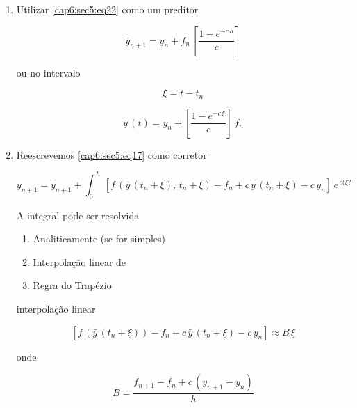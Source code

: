 \begin{enumerate}

\item Utilizar \ref{cap6:sec5:eq22} como um preditor

\begin{equation}
 \label{cap6:sec5:eq23}
 \bar{y}_{n+1} = y_n + f_n \, \left[ \frac{1 - e^{-c\,h}}{c} \right]
\end{equation}

ou no intervalo 

\[
 \xi = t - t_n
\]

\begin{equation}
 \label{cap6:sec5:eq24}
 \bar{y} \, (t) = y_n + \left[ \frac{1 - e^{-c\,\xi}}{c} \right] \, f_n
\end{equation}

\item Reescrevemos \ref{cap6:sec5:eq17} como corretor

\begin{equation}
 \label{cap6:sec5:eq25}
 y_{n+1} = \bar{y}_{n+1} + \int^{\,h}_0 \, [f \, (\bar{y} \, (t_n + \xi), \, t_n + \xi) - f_n + c \, \bar{y} \, (t_n + \xi) - c \, y_n] \, e^{\,c(\xi?}
\end{equation}

A integral pode ser resolvida

\begin{enumerate}

\item Analiticamente (se  for simples)

\item Interpolação linear de \esp{[ \, ]}

\item Regra do Trapézio

\end{enumerate}

interpolação linear

\begin{equation}
 \label{cap6:sec5:eq26}
 [f \, (\bar{y} \, (t_n + \xi)) - f_n + c\,\bar{y} \, (t_n + \xi) - c \, y_n] \approx B \, \xi
\end{equation}

onde

\begin{equation}
 \label{cap6:sec5:eq27}
 B = \frac{f_{n+1} - f_n + c \, (y_{n+1} - y_n)}{h}
\end{equation}

\begin{description}


\end{description}
\end{enumerate}
